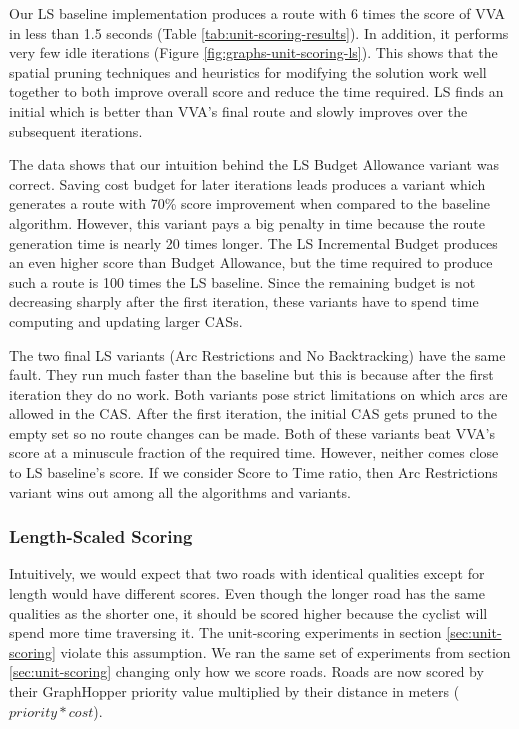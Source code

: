 \documentclass[11pt]{article}
\begin{document}
Our LS baseline implementation produces a route with 6 times the score of VVA in less than 1.5 seconds (Table \ref{tab:unit-scoring-results}). In addition, it performs very few idle iterations (Figure \ref{fig:graphs-unit-scoring-ls}). This shows that the spatial pruning techniques and heuristics for modifying the solution work well together to both improve overall score and reduce the time required. LS finds an initial which is better than VVA's final route and slowly improves over the subsequent iterations.

The data shows that our intuition behind the LS Budget Allowance variant was correct. Saving cost budget for later iterations leads produces a variant which generates a route with 70\% score improvement when compared to the baseline algorithm. However, this variant pays a big penalty in time because the route generation time is nearly 20 times longer. The LS Incremental Budget produces an even higher score than Budget Allowance, but the time required to produce such a route is 100 times the LS baseline. Since the remaining budget is not decreasing sharply after the first iteration, these variants have to spend time computing and updating larger CASs.

The two final LS variants (Arc Restrictions and No Backtracking) have the same fault. They run much faster than the baseline but this is because after the first iteration they do no work. Both variants pose strict limitations on which arcs are allowed in the CAS. After the first iteration, the initial CAS gets pruned to the empty set so no route changes can be made. Both of these variants beat VVA's score at a minuscule fraction of the required time. However, neither comes close to LS baseline's score. If we consider Score to Time ratio, then Arc Restrictions variant wins out among all the algorithms and variants.

\subsubsection{Length-Scaled Scoring}
Intuitively, we would expect that two roads with identical qualities except for length would have different scores. Even though the longer road has the same qualities as the shorter one, it should be scored higher because the cyclist will spend more time traversing it. The unit-scoring experiments in section \ref{sec:unit-scoring} violate this assumption. We ran the same set of experiments from section \ref{sec:unit-scoring} changing only how we score roads. Roads are now scored by their GraphHopper priority value multiplied by their distance in meters ($priority * cost$).  
\end{document}
